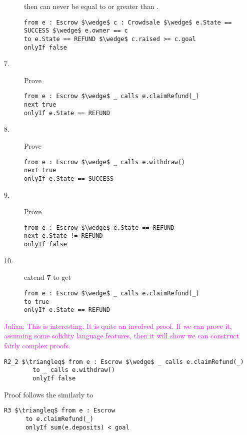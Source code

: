 \documentclass[acmsmall,review,anonymous]{acmart}\settopmatter{printfolios=true,printccs=false,printacmref=false}
\newcommand{\ponders}[3]{\marginpar{\tiny\itshape\raggedright\textcolor{#2}{\textbf{#1:} #3}}\ignorespaces}
\newcommand{\jm}[2][]{\ponders{Julian}{magenta}{#1} \textcolor{magenta}{#2}\xspace}
\begin{document}
\begin{description}
then  can never be equal to or greater than .
\begin{lstlisting}[language=Chainmail, mathescape=true, frame=lines]
from e : Escrow $\wedge$ c : Crowdsale $\wedge$ e.State == SUCCESS $\wedge$ e.owner == c
to e.State == REFUND $\wedge$ c.raised >= c.goal
onlyIf false
\end{lstlisting}
\item[7.] Prove
\begin{lstlisting}[language=Chainmail, mathescape=true, frame=lines]
from e : Escrow $\wedge$ _ calls e.claimRefund(_)
next true
onlyIf e.State == REFUND
\end{lstlisting}
\item[8.] Prove
\begin{lstlisting}[language=Chainmail, mathescape=true, frame=lines]
from e : Escrow $\wedge$ _ calls e.withdraw()
next true
onlyIf e.State == SUCCESS
\end{lstlisting}
\item[9.] Prove
\begin{lstlisting}[language=Chainmail, mathescape=true, frame=lines]
from e : Escrow $\wedge$ e.State == REFUND
next e.State != REFUND
onlyIf false
\end{lstlisting}
\item[10.] extend \textbf{7} to get 
\begin{lstlisting}[language=Chainmail, mathescape=true, frame=lines]
from e : Escrow $\wedge$ _ calls e.claimRefund(_)
to true
onlyIf e.State == REFUND
\end{lstlisting}
\end{description}
\jm[]{Julian: This is interesting. It is quite an involved proof. If we can prove it, assuming some solidity language features,
then it will show we can construct fairly complex proofs.}

\begin{lstlisting}[language = Chainmail, mathescape=true, frame=lines]
R2_2 $\triangleq$ from e : Escrow $\wedge$ _ calls e.claimRefund(_)
        to _ calls e.withdraw()
        onlyIf false
\end{lstlisting}
Proof follows the similarly to 

\begin{lstlisting}[language = Chainmail, mathescape=true, frame=lines]
R3 $\triangleq$ from e : Escrow
      to e.claimRefund(_)
      onlyIf sum(e.deposits) < goal
\end{lstlisting}
\end{document}
